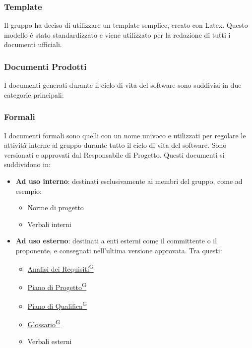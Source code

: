 \subsubsection{Template}
Il gruppo ha deciso di utilizzare un template semplice, creato con Latex. Questo modello è stato 
standardizzato e viene utilizzato per la redazione di tutti i documenti ufficiali.

\subsubsection{Documenti Prodotti}

I documenti generati durante il ciclo di vita del software sono suddivisi in due categorie principali:

\subsubsection*{Formali}
I documenti formali sono quelli con un nome univoco e utilizzati per regolare le attività interne al gruppo 
durante tutto il ciclo di vita del software. 
Sono versionati e approvati dal Responsabile di Progetto. 
Questi documenti si suddividono in:
\begin{itemize}
    \item \textbf{Ad uso interno}: destinati esclusivamente ai membri del gruppo, come ad esempio:
    \begin{itemize}
        \item Norme di progetto
        \item Verbali interni
    \end{itemize}
    \item \textbf{Ad uso esterno}: destinati a enti esterni come il committente o il proponente, e consegnati 
    nell'ultima versione approvata. Tra questi:
    \begin{itemize}
        \item \href{https://code7crusaders.github.io/docs/RTB/documentazione_interna/glossario.html#analisi-dei-requisiti}{Analisi dei Requisiti\textsuperscript{G}}
        \item \href{https://code7crusaders.github.io/docs/RTB/documentazione_interna/glossario.html#piano-di-progetto}{Piano di Progetto\textsuperscript{G}}
        \item \href{https://code7crusaders.github.io/docs/RTB/documentazione_interna/glossario.html#piano-di-qualifica}{Piano di Qualifica\textsuperscript{G}}
        \item \href{https://code7crusaders.github.io/docs/RTB/documentazione_interna/glossario.html#glossario}{Glossario\textsuperscript{G}}
        \item Verbali esterni
    \end{itemize}
\end{itemize}

